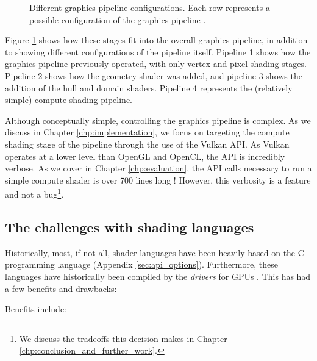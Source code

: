 \documentclass[a4paper,12pt,twoside,openright]{report}
\begin{document}
\begin{figure}[h]
\centering
\def\svgwidth{\linewidth}

\caption{Different graphics pipeline configurations. Each row represents a
possible configuration of the graphics pipeline
\cite{TripThroughGraphicsPipeline3}.}
\label{fig:graphics_pipeline_stages}
\end{figure}

Figure \ref{fig:graphics_pipeline_stages} shows how these stages fit into the
overall graphics pipeline, in addition to showing different configurations of
the pipeline itself. Pipeline 1 shows how the graphics pipeline previously
operated, with only vertex and pixel shading stages. Pipeline 2 shows how the
geometry shader was added, and pipeline 3 shows the addition of the hull and
domain shaders. Pipeline 4 represents the (relatively simple) compute shading
pipeline.

Although conceptually simple, controlling the graphics pipeline is complex. As
we discuss in Chapter \ref{chp:implementation}, we focus on targeting the
compute shading stage of the pipeline through the use of the Vulkan API. As
Vulkan operates at a lower level than OpenGL and OpenCL, the API is incredibly
verbose. As we cover in Chapter \ref{chp:evaluation}, the API calls necessary
to run a simple compute shader is over 700 lines long \cite{ProjectSource}!
However, this verbosity is a feature and not a bug\footnote{We discuss the
tradeoffs this decision makes in Chapter
\ref{chp:conclusion_and_further_work}\cite{VulkanAnnouncement}.}.

\subsection{The challenges with shading languages}

\label{sec:shading_langauge_challenges}

Historically, most, if not all, shader languages have been heavily based on the
C-programming language (Appendix \ref{sec:api_options}). Furthermore, these
languages have historically been compiled by the \textit{drivers} for GPUs
\cite{TripThroughGraphicsPipeline1}. This has had a few benefits and drawbacks:

Benefits include:
\end{document}
